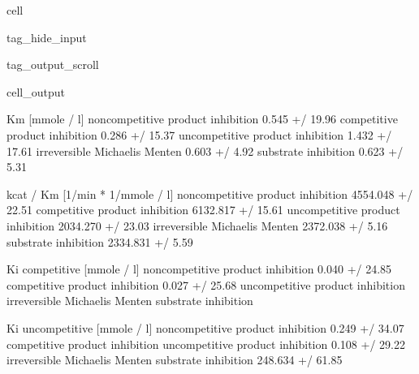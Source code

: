 \documentclass[letterpaper,10pt,english]{jupyterBook}
\begin{document}
\begin{sphinxuseclass}{cell}
\begin{sphinxuseclass}{tag_hide_input}
\begin{sphinxuseclass}{tag_output_scroll}
\begin{sphinxVerbatimOutput}
\begin{sphinxuseclass}{cell_output}
\begin{sphinxVerbatim}[commandchars=\\\{\}]
                                      Km [mmole / l]  \PYGZbs{}
non\PYGZhy{}competitive product inhibition  0.545 +/\PYGZhy{} 19.96\PYGZpc{}   
competitive product inhibition      0.286 +/\PYGZhy{} 15.37\PYGZpc{}   
uncompetitive product inhibition    1.432 +/\PYGZhy{} 17.61\PYGZpc{}   
irreversible Michaelis Menten        0.603 +/\PYGZhy{} 4.92\PYGZpc{}   
substrate inhibition                 0.623 +/\PYGZhy{} 5.31\PYGZpc{}   

                                   kcat / Km [1/min * 1/mmole / l]  \PYGZbs{}
non\PYGZhy{}competitive product inhibition             4554.048 +/\PYGZhy{} 22.51\PYGZpc{}   
competitive product inhibition                 6132.817 +/\PYGZhy{} 15.61\PYGZpc{}   
uncompetitive product inhibition               2034.270 +/\PYGZhy{} 23.03\PYGZpc{}   
irreversible Michaelis Menten                   2372.038 +/\PYGZhy{} 5.16\PYGZpc{}   
substrate inhibition                            2334.831 +/\PYGZhy{} 5.59\PYGZpc{}   

                                   Ki competitive [mmole / l]  \PYGZbs{}
non\PYGZhy{}competitive product inhibition           0.040 +/\PYGZhy{} 24.85\PYGZpc{}   
competitive product inhibition               0.027 +/\PYGZhy{} 25.68\PYGZpc{}   
uncompetitive product inhibition                            \PYGZhy{}   
irreversible Michaelis Menten                               \PYGZhy{}   
substrate inhibition                                        \PYGZhy{}   

                                   Ki uncompetitive [mmole / l]  
non\PYGZhy{}competitive product inhibition             0.249 +/\PYGZhy{} 34.07\PYGZpc{}  
competitive product inhibition                                \PYGZhy{}  
uncompetitive product inhibition               0.108 +/\PYGZhy{} 29.22\PYGZpc{}  
irreversible Michaelis Menten                                 \PYGZhy{}  
substrate inhibition                         248.634 +/\PYGZhy{} 61.85\PYGZpc{}  
\end{sphinxVerbatim}


\end{sphinxuseclass}
\end{sphinxVerbatimOutput}
\end{sphinxuseclass}
\end{sphinxuseclass}
\end{sphinxuseclass}
\end{document}
